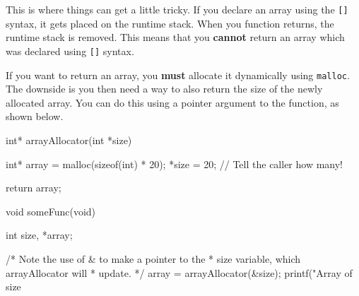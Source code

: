 This is where things can get a little tricky.
If you declare an array using the \texttt{[]} syntax, it gets placed on the runtime stack.
When you function returns, the runtime stack is removed.
This means that you \textbf{cannot} return an array which was declared using \texttt{[]} syntax.

If you want to return an array, you \textbf{must} allocate it dynamically using \texttt{malloc}.
The downside is you then need a way to also return the size of the newly allocated array.
You can do this using a pointer argument to the function, as shown below.

\begin{codeblock}
int* arrayAllocator(int *size)
{
    int* array = malloc(sizeof(int) * 20);
    *size = 20; // Tell the caller how many!

    return array;
}

void someFunc(void)
{
    int size, *array;

    /* Note the use of & to make a pointer to the
     * size variable, which arrayAllocator will
     * update.
     */
    array = arrayAllocator(&size);
    printf("Array of size %
}
\end{codeblock}
